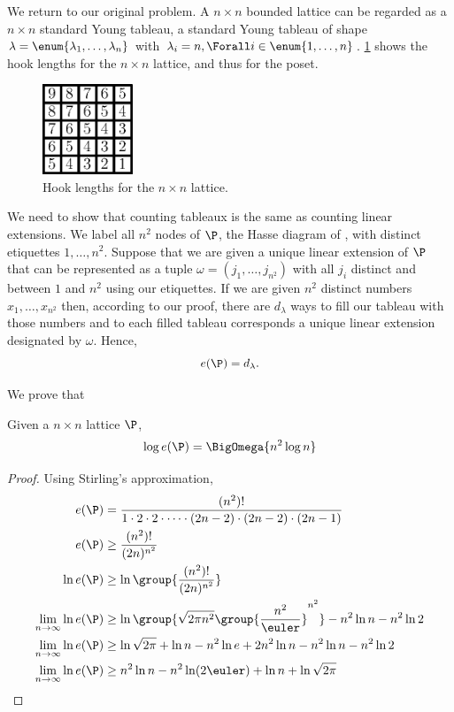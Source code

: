 We return to our original problem. A \( n \times n \) bounded lattice can be regarded as a \( n \times n \)
standard Young tableau, \ie a standard Young tableau of shape
\( \lambda = \enum{ \lambda_1 , \ldots , \lambda_n } \)
with
\( \lambda_i = n, \Forall i \in \enum{1, \ldots, n}\).
\ref{fig:xy:lattice:xyhooks} shows the hook lengths
for the \( n \times n \) lattice, and thus for the \XY poset.
\begin{figure}
\centering
\includegraphics[width=0.24\textwidth]{fig/x+y/lattice/xyhooks}
\caption{Hook lengths for the \( n \times n \) lattice.}
\label{fig:xy:lattice:xyhooks}
\end{figure}
We need to show that counting tableaux is the same as counting linear
extensions. We label all \( n^2 \) nodes of \(\P\), the Hasse diagram of
\XY, with distinct etiquettes \(1,\ldots,n^2\). Suppose that we are
given a unique linear extension of \(\P\) that can be represented as a tuple
\( \omega = ( j_1 , \ldots , j_{n^2}) \)
with all \( j_i \) distinct and between \(1\) and \( n^2 \) using our
etiquettes. If we are given \( n^2 \) distinct numbers \( x_1,\ldots,x_{n^2} \)
then, according to our proof, there are \( d_{\lambda} \) ways to
fill our tableau with those numbers and to each filled tableau corresponds a
unique linear extension designated by \(\omega\). Hence,
\begin{displaymath}
e(\P) = d_{\lambda}.
\end{displaymath}

We prove that
\begin{theorem}
Given a \( n \times n \) lattice \(\P\),
\begin{displaymath}
\log e(\P) = \BigOmega{n^2 \log n}
\end{displaymath}
\end{theorem}
\begin{proof}
Using Stirling's approximation,
\begin{align*}
e(\P) &= \frac{(n^2)!}{1 \cdot 2 \cdot 2 \cdot \cdots \cdot (2n-2) \cdot (2n-2) \cdot (2n-1)}\\
e(\P) &\ge \frac{(n^2)!}{(2n)^{n^2}}\\
\ln e(\P) &\ge \ln \group{\frac{(n^2)!}{(2n)^{n^2}}}\\
\lim_{n \to \infty} \ln e(\P) &\ge \ln{\group{\sqrt{2 \pi n^2}
\group{\frac{n^2}{\euler}}^{n^2}}}  - n^2 \ln n - n^2 \ln 2\\
\lim_{n \to \infty} \ln e(\P) &\ge \ln{\sqrt{2\pi}} + \ln n - n^2 \ln e + 2 n^2
\ln n - n^2 \ln n - n^2 \ln 2\\
\lim_{n \to \infty} \ln e(\P) &\ge n^2 \ln n - n^2 \ln (2\euler) + \ln n + \ln \sqrt{2\pi}\qedhere
\end{align*}
\end{proof}


